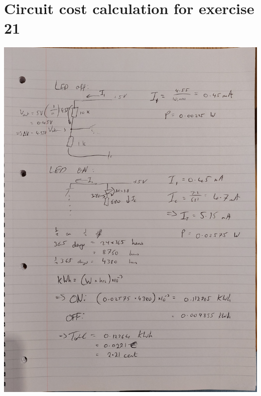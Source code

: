 \documentclass[%
reprint,
amsmath,amssymb,
aps,
floatfix
]{revtex4-2}
\begin{document}
	\section{Circuit cost calculation for exercise 21}
	\includegraphics[width=\linewidth]{ex21_calc.jpg}

	
	
\end{document}
